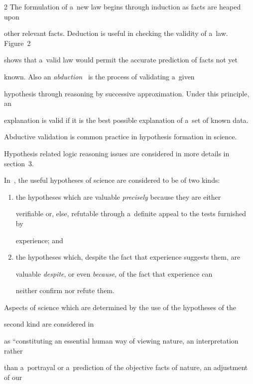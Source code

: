 \begin{multicols}{2}
  The formulation of a~new law begins through induction as facts are heaped upon


other relevant facts. Deduction is useful in checking the validity of a~law. Figure~2


shows that a~valid law would permit the accurate prediction  of  facts  not  yet


known.  Also an \textit{abduction}~\cite{6-kl} is the process of validating a~given


hypothesis through reasoning by successive approximation. Under this principle, an


explanation is valid if it is the best possible explanation of a~set of known data.


Abductive validation is common practice in hypothesis formation in science.


Hypothesis related logic reasoning issues are considered in more details in section~3.





  In~\cite{4-kl}, the useful hypotheses of science are considered to be of two kinds:


  \begin{enumerate}[(1)]


\item the hypotheses which are valuable \textit{precisely} because they are either


verifiable or, else, refutable through a~definite appeal to the tests furnished by


experience; and


\item the hypotheses which, despite the fact that experience suggests them, are


valuable \textit{despite}, or even \textit{because}, of the fact that experience can


neither confirm nor refute them.


\end{enumerate}





  Aspects of science which are determined by the use of the hypotheses of the


second kind are considered in~\cite{4-kl}


as ``constituting an essential human way of viewing nature, an interpretation rather


than a~portrayal or a~prediction of the objective facts of nature, an adjustment of our



\end{multicols}

